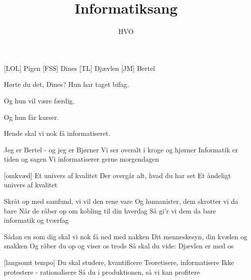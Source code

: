 \documentclass[a4paper,11pt]{article}
\title{Informatiksang}
\author{HVO}
\begin{document}
\maketitle

\begin{roles}
[LOL] Pigen
[FSS] Dines
[TL] Djævlen
[JM] Bertel
\end{roles}

\begin{sketch}


 Hørte du det, Dines?  Hun har taget bifag.

 Og hun vil være færdig.

 Og hun får kurser.

 Hende skal vi nok få informatiseret.


\end{sketch}

\begin{song}

 Jeg er Bertel - og jeg er Bjørner
  Vi ser overalt i kroge og hjørner
  Informatik er tiden og sagen
  Vi informatiserer gerne morgendagen

[omkvæd] Et univers af kvalitet
  Der overgår alt, hvad du har set
  Et åndeligt univers af kvalitet

 Skråt op med samfund, vi vil den rene vare
  Og humanister, dem skrotter vi da bare
  Når de råber op om kobling til din hverdag
  Så gi'r vi dem da bare informatik og tværfag


 Sådan en som dig skal vi nok få ned med nakken
  Dit menneskesyn, din kvælen og snakken
  Og råber du op og viser os trods
  Så skal du vide: Djævlen er med os 


[langsomt tempo]
  Du skal studere, kvantificere
  Teoretisere, informatisere
  Ikke protestere - rationalisere
  Så du i produktionen, så vi kan profitere


\end{song}
\end{document}
